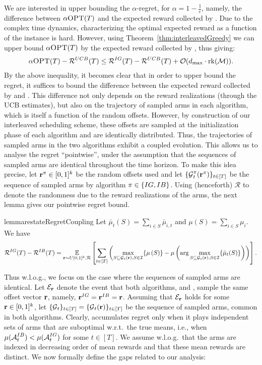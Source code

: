 We are interested in upper bounding the $\alpha$-regret, for $\alpha = 1- \frac{1}{e}$, namely, the difference between $\alpha \textsc{OPT}(T)$ and the expected reward collected by \UCB. Due to the complex time dynamics, characterizing the optimal expected reward as a function of the instance is hard. However, using Theorem~\ref{thm:interleavedGreedy} we can upper bound $\alpha \textsc{OPT}(T)$ by the expected reward collected by \IG, thus giving:
\begin{align} \label{eq:regret:twoalgos}
\alpha \textsc{OPT}(T) - \operatorname{\mathcal{R}}^{UCB}(T)  \leq \operatorname{\mathcal{R}}^{IG}(T) - \operatorname{\mathcal{R}}^{UCB}(T) + \mathcal{O}(d_{\max} \cdot \operatorname{rk}(\operatorname{\mathcal{M}})).
\end{align}
By the above inequality, it becomes clear that in order to upper bound the regret, it suffices to bound the difference between the expected reward collected by \IG and \UCB. This difference not only depends on the reward realizations (through the UCB estimates), but also on the trajectory of sampled arms in each algorithm, which is itself a function of the random offsets. However, by construction of our interleaved scheduling scheme, these offsets are sampled at the initialization phase of each algorithm and are identically distributed. Thus, the trajectories of sampled arms in the two algorithms exhibit a coupled evolution. This allows us to analyse the regret ``pointwise'', under the assumption that the sequences of sampled arms are identical throughout the time horizon. To make this idea precise, let $\operatorname{\mathbf{r}}^{\pi} \in [0,1]^k$ be the random offsets used and let $\{\operatorname{\mathcal{G}}^{\pi}_t(\operatorname{\mathbf{r}}^{\pi})\}_{t \in [T]}$ be the sequence of sampled arms by algorithm $\pi \in \{IG, IB\}$. Using (henceforth) $\mathcal{R}$ to denote the randomness due to the reward realizations of the arms, the next lemma gives our pointwise regret bound.


\begin{restatable}{lemma}{restateRegretCoupling}
\label{lem:regret:coupling} Let $\bar{\mu}_t(S) = \sum_{i \in S} \bar{\mu}_{i,t}$ and $\mu(S) = \sum_{i \in S} \mu_i$. We have
\begin{align*}
    \operatorname{\mathcal{R}}^{IG}(T) - \operatorname{\mathcal{R}}^{IB}(T) =  \mathop{\underset{\operatorname{\mathbf{r}} \sim U[0,1]^k, \mathcal{R}}{\mathbb{E}}\left[\sum_{t \in [T]}\left( \max_{S \subseteq \operatorname{\mathcal{G}}_t(\operatorname{\mathbf{r}}), S \in \operatorname{\mathcal{I}}} \{ \mu\left(S\right)\} - \mu\left(\arg\max_{S \subseteq \operatorname{\mathcal{G}}_t(\operatorname{\mathbf{r}}), S \in \operatorname{\mathcal{I}}}\{\bar\mu_t(S)\}\right)\right)\right]}.
\end{align*}
\end{restatable}

Thus w.l.o.g., we focus on the case where the sequences of sampled arms are identical. Let  $\mathcal{E}_{\operatorname{\mathbf{r}}}$ denote the event that both algorithms, \IG and \UCB, sample the same offset vector $\operatorname{\mathbf{r}}$, namely, $\operatorname{\mathbf{r}}^{IG} = \operatorname{\mathbf{r}}^{IB} = \operatorname{\mathbf{r}}$. Assuming that $\mathcal{E}_{\operatorname{\mathbf{r}}}$ holds for some $\operatorname{\mathbf{r}} \in [0,1]^k$, let $\{\operatorname{\mathcal{G}}_t\}_{t \in [T]} = \{\operatorname{\mathcal{G}}_t(\operatorname{\mathbf{r}})\}_{t \in [T]}$ be the sequence of sampled arms, common in both algorithms. Clearly, \UCB accumulates regret only when it plays independent sets of arms that are suboptimal w.r.t.\ the true means, i.e., when $\mu(\operatorname{\mathcal{A}}^{IB}_t) < \mu(\operatorname{\mathcal{A}}^{IG}_t)$ for some $t \in [T]$. We assume w.l.o.g.\ that the arms are indexed in decreasing order of mean rewards and that these mean rewards are distinct. We now formally define the gaps related to our analysis:

